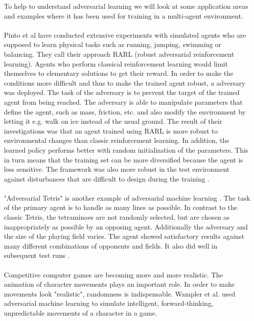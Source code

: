 To help to understand adversarial learning we will look at some application areas and examples where it has been used for training in a multi-agent environment.\\
\\
Pinto et al \cite{robustPinto2017Mar} have conducted extensive experiments with simulated agents who are supposed to learn physical tasks such as running, jumping, swimming or balancing. They call their approach RARL (robust adversarial reinforcement learning). Agents who perform classical reinforcement learning would limit themselves to elementary solutions to get their reward. In order to make the conditions more difficult and thus to make the trained agent robust, a adversary was deployed. The task of the adversary is to prevent the target of the trained agent from being reached. The adversary is able to manipulate parameters that define the agent, such as mass, friction, etc. and also modify the environment by letting it e.g. walk on ice instead of the usual ground.
The result of their investigations was that an agent trained using RARL is more robust to environmental changes than classic reinforcement learning. In addition, the learned policy performs better with random initialization of the parameters. This in turn means that the training set can be more diversified because the agent is less sensitive. The framework was also more robust in the test environment against disturbances that are difficult to design during the training \cite{robustPinto2017Mar}.\\
\\
"Adversarial Tetris" is another example of adversarial machine learning \cite{tetrisRovatsou2010May}. The task of the primary agent is to handle as many lines as possible. In contrast to the classic Tetris, the tetraminoes are not randomly selected, but are chosen as inappropriately as possible by an opposing agent. Additionally the adversary and the size of the playing field varies. 
The agent showed satisfactory results against many different combinations of opponents and fields. It also did well in subsequent test runs \cite{tetrisRovatsou2010May}.\\
\\
Competitive computer games are becoming more and more realistic. The animation of character movements plays an important role. In order to make movements look "realistic", randomness is indispensable. Wampler et al. \cite{animationwampler2010character} used adversarial machine learning to simulate intelligent, forward-thinking, unpredictable movements of a character in a game. 
